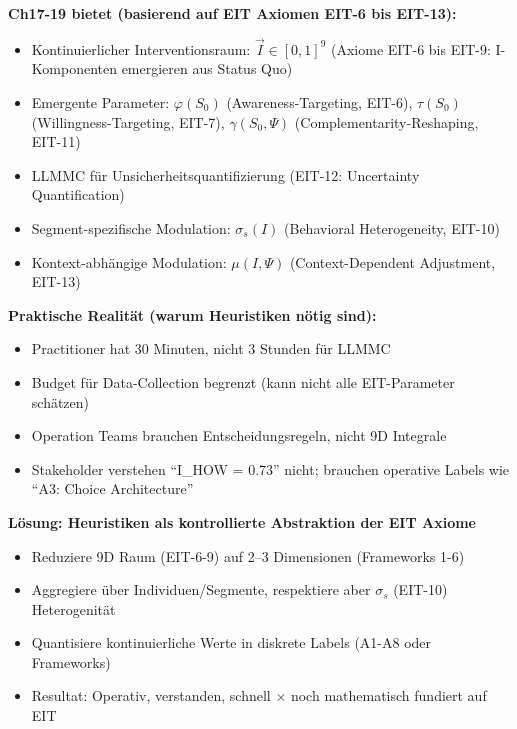 \begin{tcolorbox}[colback=red!5!white, colframe=red!75!black, title=\textbf{Das Kernproblem: Kontinuität vs. Praktikabilität}]

\textbf{Ch17-19 bietet (basierend auf EIT Axiomen EIT-6 bis EIT-13):}
\begin{itemize}[nosep]
\item Kontinuierlicher Interventionsraum: $\vec{I} \in [0,1]^9$ (Axiome EIT-6 bis EIT-9: I-Komponenten emergieren aus Status Quo)
\item Emergente Parameter: $\varphi(S_0)$ (Awareness-Targeting, EIT-6), $\tau(S_0)$ (Willingness-Targeting, EIT-7), $\gamma(S_0, \Psi)$ (Complementarity-Reshaping, EIT-11)
\item LLMMC für Unsicherheitsquantifizierung (EIT-12: Uncertainty Quantification)
\item Segment-spezifische Modulation: $\sigma_s(I)$ (Behavioral Heterogeneity, EIT-10)
\item Kontext-abhängige Modulation: $\mu(I, \Psi)$ (Context-Dependent Adjustment, EIT-13)
\end{itemize}

\textbf{Praktische Realität (warum Heuristiken nötig sind):}
\begin{itemize}[nosep]
\item Practitioner hat 30 Minuten, nicht 3 Stunden für LLMMC
\item Budget für Data-Collection begrenzt (kann nicht alle EIT-Parameter schätzen)
\item Operation Teams brauchen Entscheidungsregeln, nicht 9D Integrale
\item Stakeholder verstehen ``I_HOW = 0.73'' nicht; brauchen operative Labels wie ``A3: Choice Architecture''
\end{itemize}

\textbf{Lösung: Heuristiken als kontrollierte Abstraktion der EIT Axiome}
\begin{itemize}[nosep]
\item Reduziere 9D Raum (EIT-6-9) auf 2--3 Dimensionen (Frameworks 1-6)
\item Aggregiere über Individuen/Segmente, respektiere aber $\sigma_s$ (EIT-10) Heterogenität
\item Quantisiere kontinuierliche Werte in diskrete Labels (A1-A8 oder Frameworks)
\item Resultat: Operativ, verstanden, schnell $\times$ noch mathematisch fundiert auf EIT
\end{itemize}


\end{tcolorbox}
